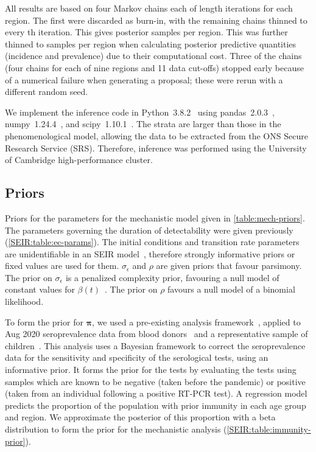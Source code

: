 \documentclass[9pt,twocolumn,twoside]{pnas-new}
\renewcommand{\vec}[1]{\bm{#1}}
\begin{document}
All results are based on four Markov chains each of length  iterations for each region.
The first  were discarded as burn-in, with the remaining chains thinned to every th iteration.
This gives  posterior samples per region.
This was further thinned to  samples per region when calculating posterior predictive quantities (incidence and prevalence) due to their computational cost.
Three of the  chains (four chains for each of nine regions and 11 data cut-offs) stopped early because of a numerical failure when generating a proposal; these were rerun with a different random seed.

We implement the inference code in Python~3.8.2~\citep{python} using pandas~2.0.3~\citep{pandas}, numpy~1.24.4~\citep{numpy}, and scipy~1.10.1~\citep{scipy}.
The strata are larger than those in the phenomenological model, allowing the data to be extracted from the ONS Secure Research Service (SRS).
Therefore, inference was performed using the University of Cambridge high-performance cluster.

\subsection*{Priors} \label{sec:mech-priors}

Priors for the parameters for the mechanistic model given in \cref{table:mech-priors}.
The parameters governing the duration of detectability were given previously (\cref{SEIR:table:ec-params}).
The initial conditions and transition rate parameters are unidentifiable in an SEIR model~\citep{dankwaStructural}, therefore strongly informative priors or fixed values are used for them.
$\sigma_\epsilon$ and $\rho$ are given priors that favour parsimony.
The prior on $\sigma_\epsilon$ is a penalized complexity prior, favouring a null model of constant values for $\beta(t)$~\citep{simpsonPenalising}.
The prior on $\rho$ favours a null model of a binomial likelihood.

To form the prior for $\vec{\pi}$, we used a pre-existing analysis framework~\citep{amirthalingamSeroprevalence}, applied to Aug 2020 seroprevalence data from blood donors~\citep{amirthalingamSeroprevalence} and a representative sample of children~\citep{ratcliffeCommunity}.
This analysis uses a Bayesian framework to correct the seroprevalence data for the sensitivity and specificity of the serological tests, using an informative prior.
It forms the prior for the tests by evaluating the tests using samples which are known to be negative (taken before the pandemic) or positive (taken from an individual following a positive RT-PCR test).
A regression model predicts the proportion of the population with prior immunity in each age group and region.
We approximate the posterior of this proportion with a beta distribution to form the prior for the mechanistic analysis (\cref{SEIR:table:immunity-prior}).
\end{document}
